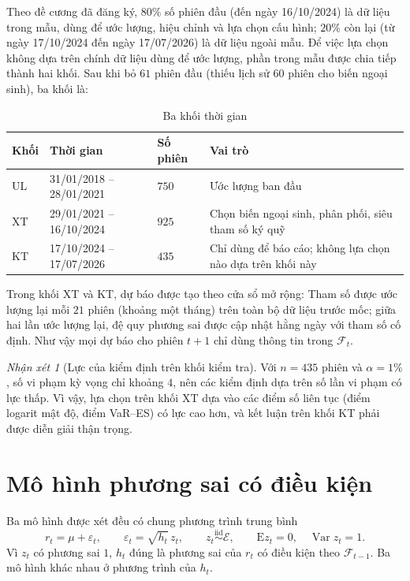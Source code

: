 \documentclass[12pt,a4paper]{article}
\theoremstyle{definition}
\theoremstyle{remark}
\newtheorem{nhanxet}{Nhận xét}[section]
\newcommand{\E}{\mathrm{E}}
\newcommand{\Var}{\operatorname{Var}}
\newcommand{\Fcal}{\mathcal{F}}
\newcommand{\Ecal}{\mathcal{E}}
\newcommand{\UL}{\mathrm{UL}}
\newcommand{\XT}{\mathrm{XT}}
\newcommand{\KT}{\mathrm{KT}}
\begin{document}
Theo đề cương đã đăng ký, $80\%$ số phiên đầu (đến ngày 16/10/2024) là dữ liệu trong mẫu, dùng để ước lượng, hiệu chỉnh và lựa chọn cấu hình; $20\%$ còn lại (từ ngày 17/10/2024 đến ngày 17/07/2026) là dữ liệu ngoài mẫu. Để việc lựa chọn không dựa trên chính dữ liệu dùng để ước lượng, phần trong mẫu được chia tiếp thành hai khối. Sau khi bỏ $61$ phiên đầu (thiếu lịch sử $60$ phiên cho biến ngoại sinh), ba khối là:

\begin{table}[h]
\centering
\caption{Ba khối thời gian}\label{tab:khoi}
\begin{tabular}{@{}lllp{6.6cm}@{}}
\toprule
\textbf{Khối} & \textbf{Thời gian} & \textbf{Số phiên} & \textbf{Vai trò} \\
\midrule
$\UL$ & 31/01/2018 -- 28/01/2021 & $750$ & Ước lượng ban đầu \\
$\XT$ & 29/01/2021 -- 16/10/2024 & $925$ & Chọn biến ngoại sinh, phân phối, siêu tham số ký quỹ \\
$\KT$ & 17/10/2024 -- 17/07/2026 & $435$ & Chỉ dùng để báo cáo; không lựa chọn nào dựa trên khối này \\
\bottomrule
\end{tabular}
\end{table}

Trong khối $\XT$ và $\KT$, dự báo được tạo theo cửa sổ mở rộng: Tham số được ước lượng lại mỗi $21$ phiên (khoảng một tháng) trên toàn bộ dữ liệu trước mốc; giữa hai lần ước lượng lại, đệ quy phương sai được cập nhật hằng ngày với tham số cố định. Như vậy mọi dự báo cho phiên $t+1$ chỉ dùng thông tin trong $\Fcal_t$.

\begin{nhanxet}[Lực của kiểm định trên khối kiểm tra]
Với $n=435$ phiên và $\alpha=1\%$, số vi phạm kỳ vọng chỉ khoảng $4$, nên các kiểm định dựa trên số lần vi phạm có lực thấp. Vì vậy, lựa chọn trên khối $\XT$ dựa vào các điểm số liên tục (điểm logarit mật độ, điểm VaR--ES) có lực cao hơn, và kết luận trên khối $\KT$ phải được diễn giải thận trọng.
\end{nhanxet}

\section{Mô hình phương sai có điều kiện}\label{sec:mohinh}

Ba mô hình được xét đều có chung phương trình trung bình
\begin{equation}\label{eq:tb}
r_t=\mu+\varepsilon_t,\qquad \varepsilon_t=\sqrt{h_t}\,z_t,\qquad z_t\overset{\text{iid}}{\sim}\Ecal,\qquad \E z_t=0,\quad \Var z_t=1 .
\end{equation}
Vì $z_t$ có phương sai $1$, $h_t$ đúng là phương sai của $r_t$ có điều kiện theo $\Fcal_{t-1}$. Ba mô hình khác nhau ở phương trình của $h_t$.
\end{document}

